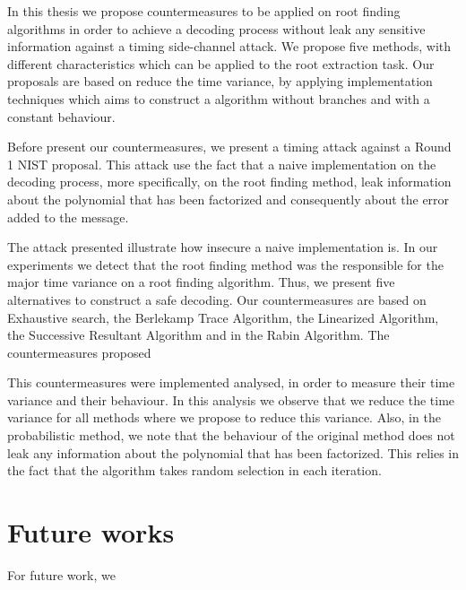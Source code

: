 In this thesis we propose countermeasures to be applied on root finding algorithms in order to achieve a decoding process without leak any sensitive information against a timing side-channel attack. We propose five methods, with different characteristics which can be applied to the root extraction task. Our proposals are based on reduce the time variance, by applying implementation techniques which aims to construct a algorithm without branches and with a constant behaviour. 

Before present our countermeasures, we present a timing attack against a Round 1 NIST proposal. This attack use the fact that a naive implementation on the decoding process, more specifically, on the root finding method, leak information about the polynomial that has been factorized and consequently about the error added to the message. 

The attack presented illustrate how insecure a naive implementation is. In our experiments we detect that the root finding method was the responsible for the major time variance on a root finding algorithm. Thus, we present five alternatives to construct a safe decoding. Our countermeasures are based on Exhaustive search, the Berlekamp Trace Algorithm, the Linearized Algorithm, the Successive Resultant Algorithm and in the Rabin Algorithm. The countermeasures proposed 

This countermeasures were implemented analysed, in order to measure their time variance and their behaviour. In this analysis we observe that we reduce the time variance for all methods where we propose to reduce this variance. Also, in the probabilistic method, we note that the behaviour of the original method does not leak any information about the polynomial that has been factorized. This relies in the fact that the algorithm takes random selection in each iteration. 

\section{Future works}
For future work, we 
